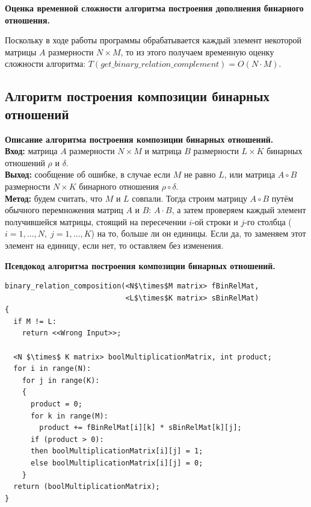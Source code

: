 \documentclass[spec, och, otchet, hidelinks]{SCWorks}
\newcommand{\tbf}[1]{\textbf{#1}}
\begin{document}
\par \tbf{Оценка временной сложности алгоритма построения дополнения бинарного
  отношения.}
\par Поскольку в ходе работы программы обрабатывается каждый элемент некоторой
матрицы $A$ размерности $N \times M$, то из этого получаем временную оценку
сложности алгоритма: $T(get\_binary\_relation\_complement) = O(N \cdot M)$.

\newpage

\subsection{Алгоритм построения композиции бинарных отношений}
\par \tbf{Описание алгоритма построения композиции бинарных отношений.} \\
\tbf{Вход:} матрица $A$ размерности $N \times M$ и матрица $B$ размерности $L
\times K$ бинарных отношений $\rho$ и $\delta$. \\
\tbf{Выход:} сообщение об ошибке, в случае если $M$ не равно $L$, или матрица $A
\circ B$ размерности $N \times K$ бинарного отношения $\rho \circ \delta$. \\
\tbf{Метод:} будем считать, что $M$ и $L$ совпали. Тогда строим матрицу $A \circ
B$ путём обычного перемножения матриц $A$ и $B$: $A \cdot B$, а затем проверяем
каждый элемент получившейся матрицы, стоящий на пересечении $i$-ой строки и
$j$-го столбца ($i = 1,\dots,N, \; j = 1,\dots,K$) на то, больше ли он единицы.
Если да, то заменяем этот элемент на единицу, если нет, то оставляем без
изменения. 

\par \tbf{Псевдокод алгоритма построения композиции бинарных отношений.}
\begin{lstlisting}[caption=Псевдокод алгоритма., mathescape]
binary_relation_composition(<N$\times$M matrix> fBinRelMat,
                            <L$\times$K matrix> sBinRelMat)
{
  if M != L:
    return <<Wrong Input>>;

  <N $\times$ K matrix> boolMultiplicationMatrix, int product;
  for i in range(N):
    for j in range(K):
    {
      product = 0;
      for k in range(M):
        product += fBinRelMat[i][k] * sBinRelMat[k][j];
      if (product > 0):
      then boolMultiplicationMatrix[i][j] = 1;
      else boolMultiplicationMatrix[i][j] = 0;
    }
  return (boolMultiplicationMatrix);
}
\end{lstlisting}
\end{document}
